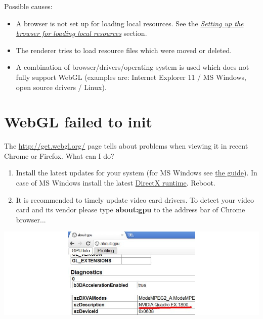 \documentclass[a4paper,12pt,oneside]{sphinxmanual}
\begin{document}
Possible causes:
\begin{itemize}
\item {} 
A browser is not set up for loading local resources. See the {\hyperref[setup:browser-for-local-loading]{\emph{Setting up the browser for loading local resources}}} section.

\item {} 
The renderer tries to load resource files which were moved or deleted.

\item {} 
A combination of browser/drivers/operating system is used which does not fully support WebGL (examples are: Internet Explorer 11 / MS Windows, open source drivers / Linux).

\end{itemize}


\section{WebGL failed to init}
\label{problems_and_solutions:webgl}\label{problems_and_solutions:webgl-not-working}
The \href{http://get.webgl.org/}{http://get.webgl.org/} page tells about problems when viewing it in recent Chrome or Firefox. What can I do?
\begin{enumerate}
\item {} 
Install the latest updates for your system (for MS Windows see \href{http://support.microsoft.com/kb/311047}{the guide}). In case of MS Windows install the latest \href{http://www.microsoft.com/en-us/download/details.aspx?id=35}{DirectX runtime}. Reboot.

\item {} 
It is recommended to timely update video card drivers. To detect your video card and its vendor please type \textbf{about:gpu} to the address bar of Chrome browser...

\end{enumerate}

{\hfill\includegraphics[width=1.000\linewidth]{about_gpu_directx.jpg}\hfill}
\end{document}
